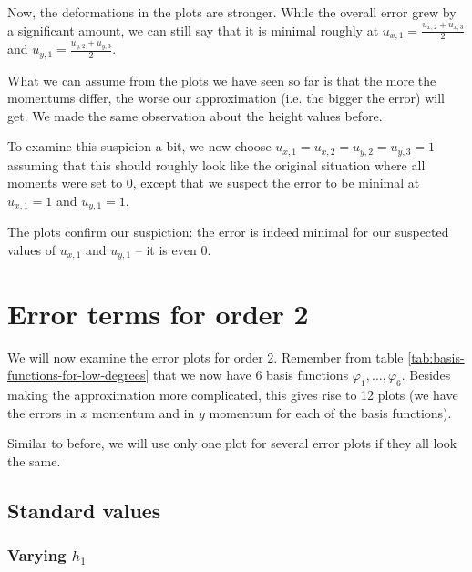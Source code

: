 \documentclass{article}
\renewcommand{\phi}{\varphi}
\begin{document}


Now, the deformations in the plots are stronger. While the overall error grew by a significant amount, we can still say that it is minimal roughly at $u_{x,1}=\frac{u_{x,2}+u_{x,3}}{2}$ and $u_{y,1}=\frac{u_{y,2}+u_{y,3}}{2}$.

What we can assume from the plots we have seen so far is that the more the momentums differ, the worse our approximation (i.e. the bigger the error) will get. We made the same observation about the height values before.

To examine this suspicion a bit, we now choose $u_{x,1}=u_{x,2}=u_{y,2}=u_{y,3}=1$ assuming that this should roughly look like the original situation where all moments were set to 0, except that we suspect the error to be minimal at $u_{x,1}=1$ and $u_{y,1}=1$.



The plots confirm our suspiction: the error is indeed minimal for our suspected values of $u_{x,1}$ and $u_{y,1}$ -- it is even 0.

\clearpage{}

\section{Error terms for order 2}
\label{sec:stiffness-analyis-ord-2}

We will now examine the error plots for order 2. Remember from table \ref{tab:basis-functions-for-low-degrees} that we now have 6 basis functions $\phi_1,\dots,\phi_6$. Besides making the approximation more complicated, this gives rise to 12 plots (we have the errors in $x$ momentum and in $y$ momentum for each of the basis functions).

Similar to before, we will use only one plot for several error plots if they all look the same.

\subsection{Standard values}
\label{sec:stiffness-analyiss-ord2-default}

\subsubsection{\texorpdfstring{Varying $h_1$}{Varying h1}}
\label{sec:stiffness-analysis-ord2-default-var-h1}
\end{document}
